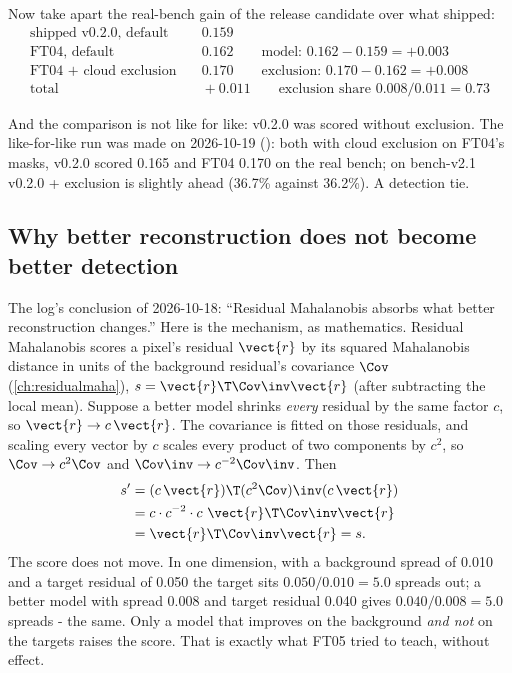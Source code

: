 Now take apart the real-bench gain of the release candidate over what shipped:
\begin{align*}
\text{shipped v0.2.0, default} &\quad 0.159\\
\text{FT04, default} &\quad 0.162 \qquad \text{model: } 0.162 - 0.159 = +0.003\\
\text{FT04 + cloud exclusion} &\quad 0.170 \qquad \text{exclusion: } 0.170 - 0.162 = +0.008\\
\text{total} &\quad +0.011 \qquad \text{exclusion share } 0.008 / 0.011 = 0.73
\end{align*}


And the comparison is not like for like: v0.2.0 was scored without exclusion. The like-for-like run was made on
2026-10-19 (): both with cloud exclusion on FT04's masks, v0.2.0 scored
0.165 and FT04 0.170 on the real bench; on bench-v2.1 v0.2.0 + exclusion is slightly ahead (36.7\% against
36.2\%). A detection tie.

\subsection{Why better reconstruction does not become better detection}\label{sec:ftruns:absorb}

The log's conclusion of 2026-10-18: ``Residual Mahalanobis absorbs what better reconstruction changes.'' Here is the
mechanism, as mathematics. Residual Mahalanobis scores a pixel's residual $\vect{r}$ by its squared Mahalanobis distance
in units of the background residual's covariance $\Cov$ (\cref{ch:residualmaha}), $s = \vect{r}\T\Cov\inv\vect{r}$
(after subtracting the local mean). Suppose a better model shrinks \emph{every} residual by the same factor $c$, so
$\vect{r} \to c\,\vect{r}$. The covariance is fitted on those residuals, and scaling every vector by $c$ scales every
product of two components by $c^2$, so $\Cov \to c^2\Cov$ and $\Cov\inv \to c^{-2}\Cov\inv$. Then
\begin{align*}
s' &= (c\,\vect{r})\T (c^2\Cov)\inv (c\,\vect{r})\\
 &= c \cdot c^{-2} \cdot c\ \vect{r}\T\Cov\inv\vect{r}\\
 &= \vect{r}\T\Cov\inv\vect{r} = s .
\end{align*}
The score does not move. In one dimension, with a background spread of 0.010 and a target residual of 0.050 the target
sits $0.050 / 0.010 = 5.0$ spreads out; a better model with spread 0.008 and target residual 0.040 gives $0.040 /
0.008 = 5.0$ spreads - the same\tagA. Only a model that improves on the background \emph{and not} on the targets raises
the score. That is exactly what FT05 tried to teach, without effect.

